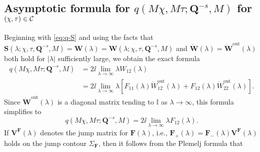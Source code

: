 \subsection{Asymptotic formula for 
$q(M\chi,M\tau;\mathbf{Q}^{-s},M)$
for $(\chi,\tau)\in \mathcal{C}$}
Beginning with \eqref{eq:q-S} and using the facts that $\mathbf{S}(\lambda;\chi,\tau,\mathbf{Q}^{-s},M)=\mathbf{W}(\lambda)=\mathbf{W}(\lambda;\chi,\tau,\mathbf{Q}^{-s},M)$ and $\dot{\mathbf{W}}(\lambda)=\dot{\mathbf{W}}^\mathrm{out}(\lambda)$ both hold for $|\lambda|$ sufficiently large, we obtain the exact formula
\begin{equation}
\begin{split}
q(M\chi,M\tau;\mathbf{Q}^{-s},M)&=2\ii\lim_{\lambda\to\infty}\lambda W_{12}(\lambda)\\
&=
2\ii\lim_{\lambda\to\infty}\lambda\left[F_{11}(\lambda)\dot{W}^\mathrm{out}_{12}(\lambda)+F_{12}(\lambda)\dot{W}^\mathrm{out}_{22}(\lambda)\right].
\end{split}
\label{eq:psi-k-exact-channels-ALT}
\end{equation}
Since $\dot{\mathbf{W}}^\mathrm{out}(\lambda)$ is a diagonal matrix tending to $\mathbb{I}$ as $\lambda\to\infty$, this formula simplifies to
\begin{equation}
q(M\chi,M\tau;\mathbf{Q}^{-s},M)=
2\ii\lim_{\lambda\to\infty}\lambda F_{12}(\lambda).
\end{equation}
If $\mathbf{V}^\mathbf{F}(\lambda)$ denotes the jump matrix for $\mathbf{F}(\lambda)$, i.e., $\mathbf{F}_+(\lambda)=\mathbf{F}_-(\lambda)\mathbf{V}^\mathbf{F}(\lambda)$ holds on the jump contour $\Sigma_\mathbf{F}$, then it follows from the Plemelj formula that
